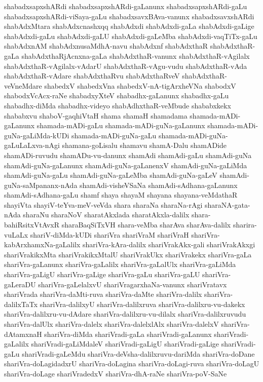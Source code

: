 {shabadxsapxshARdi
shabadxsapxshARdi-gaLanunx
shabadxsapxshARdi-gaLu
shabadxsapxshARdi-viSaya-gaLu
shabadxsavxBAva-vanunx
shabadxsavxshARdi
shabAdxMtara
shabAdxcnashxqq
shabAdxdi
shabAdxdi-gaLa
shabAdxdi-gaLige
shabAdxdi-gaLu
shabAdxdi-gaLU
shabAdxdi-gaLeMba
shabAdxdi-vaqTiTx-gaLu
shabAdxnAM
shabAdxnusaMdhA-navu
shabAdxnf
shabAdxthaR
shabAdxthaR-gaLa
shabAdxthaRjAcnxna-gaLa
shabAdxthaR-vanunx
shabAdxthaR-vAgilalx
shabAdxthaR-vAgilalx-vAdarU
shabAdxthaR-vAgu-vudu
shabAdxthaR-vAda
shabAdxthaR-vAdare
shabAdxthaRvu
shabAdxthaRveV
shabAdxthaR-veVneMdare
shabedxV
shabedxVna
shabedxV-nA-tigArxheVNa
shabodxV
shabodxVcAcx-raNe
shabadxyXteV
shabadhx-gaLanunx
shabadhx-gaLu
shabadhx-diMda
shabadhx-videyo
shabAdhxthaR-veMbude
shababxkekx
shababxvu
shaboV-gaqhiVtaH
shama
shamaH
shamadama
shamada-mADi-gaLanunx
shamada-mADi-gaLu
shamada-mADi-guNa-gaLanunx
shamada-mADi-guNa-gaLiMda-kUDi
shamada-mADi-guNa-gaLu
shamada-mADi-guNa-gaLuLaLxva-nAgi
shamana-goLisalu
shamavu
shamA-Dalu
shamADide
shamADi-ruvudu
shamADu-vu-danunx
shamAdi
shamAdi-gaLu
shamAdi-guNa
shamAdi-guNa-gaLanunx
shamAdi-guNa-gaLanenxV
shamAdi-guNa-gaLiMda
shamAdi-guNa-gaLu
shamAdi-guNa-gaLeMba
shamAdi-guNa-gaLeV
shamAdi-guNa-saMpananx-nAda
shamAdi-visheVSaNa
shamAdi-sAdhana-gaLanunx
shamAdi-sAdhana-gaLu
shamf
shaya
shayaM
shayana
shayana-veMdathaR
shayiVta
shayiV-teYva-meV-veVda
shara
sharaNa
sharaNa-rAgi
sharaNA-gata-nAda
sharaNu
sharaNoV
sharatAkxlada
sharatAkxla-dalilx
shara-bahiRsitxVtAvxR
sharaBaqSiTxVH
shara-veMba
sharAva
sharAva-dalilx
sharira-vuLaLx
shariV-diMda-kUDi
shariVra
shariVraM
shariVraH
shariVra-kabArxhamxNa-gaLalilx
shariVra-kAra-dalilx
shariVrakAkx-gali
shariVrakAkxgi
shariVrakikxMta
shariVrakikxMtalU
shariVrakUkx
shariVrakekx
shariVra-gaLa
shariVra-gaLanunx
shariVra-gaLalilx
shariVra-gaLalUlx
shariVra-gaLiMda
shariVra-gaLigU
shariVra-gaLige
shariVra-gaLu
shariVra-gaLU
shariVra-gaLeraDU
shariVra-gaLelalxvU
shariVragarxhaNa-vanunx
shariVratavx
shariVrada
shariVra-daMti-ruva
shariVra-daMte
shariVra-dalilx
shariVra-dalilxTaTx
shariVra-dalilxyU
shariVra-dalilxruva
shariVra-dalilxru-vu-dakekx
shariVra-dalilxru-vu-dAdare
shariVra-dalilxru-vu-dilalx
shariVra-dalilxruvudu
shariVra-dalUlx
shariVra-dalelx
shariVra-dalelxlAlx
shariVra-dalelxV
shariVra-dAtamxnaH
shariVra-diMda
shariVradi-gaLa
shariVradi-gaLanunx
shariVradi-gaLalilx
shariVradi-gaLiMdaleV
shariVradi-gaLigU
shariVradi-gaLige
shariVradi-gaLu
shariVradi-gaLeMdu
shariVra-deVsha-dalilxruvu-dariMda
shariVra-doDane
shariVra-doLagidadxrU
shariVra-doLagina
shariVra-doLagi-ruva
shariVra-doLagU
shariVra-doLage
shariVradedxV
shariVra-dhA-raNe
shariVra-poV-SaNe
}
